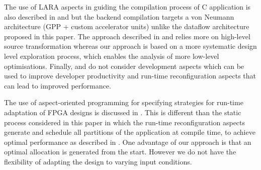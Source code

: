 The use of LARA aspects in guiding the compilation process of C
application is also described in
\cite{Cardoso:Teixeira:Alves:Nobre:Diniz:Cutinho:Luk:2012} and
\cite{cardoso2011new} but the backend compilation targets a von
Neumann architecture (GPP + custom accelerator units) unlike the
dataflow architecture proposed in this paper. The approach described
in \cite{Cardoso:Teixeira:Alves:Nobre:Diniz:Cutinho:Luk:2012} and
\cite{cardoso2011new} relies more on high-level source transformation
whereas our approach is based on a more systematic design level
exploration process, which enables the analysis of more low-level
optimisations. Finally,
\cite{Cardoso:Teixeira:Alves:Nobre:Diniz:Cutinho:Luk:2012} and
\cite{cardoso2011new} do not consider development aspects which can be
used to improve developer productivity and run-time reconfiguration
aspects that can lead to improved performance.

The use of aspect-oriented programming for specifying strategies for
run-time adaptation of FPGA designs is discussed in
\cite{6322875}. This is different than the static process considered
in this paper in which the run-time reconfiguration aspects generate
and schedule all partitions of the application at compile time, to
achieve optimal performance as described in
\cite{Xinyu:Qiwei:Luk:Qiang:Pell:2012}. One advantage of our approach
is that an optimal allocation is generated from the start. However we
do not have the flexibility of adapting the design to varying input
conditions.
